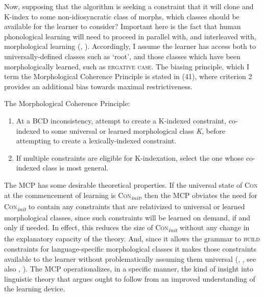 \documentclass[output=paper,
modfonts
]{LSP/langsci}
\begin{document}
Now, supposing that the algorithm is seeking a constraint that it will clone and K-index to some non-idiosyncratic class of morphs, which classes should be available for the learner to consider? Important here is the fact that human phonological learning will need to proceed in parallel with, and interleaved with, morphological learning (\citealt{tesar2007}, \citealt[6]{merchant2008}). Accordingly, I assume the learner has access both to universally-defined classes such as `root', and those classes which have been morphologically learned, such as \textsc{ergative case}. The biasing principle, which I term the Morphological Coherence Principle is stated in (41), where criterion 2 provides an additional bias towards maximal restrictiveness.

\ea The Morphological Coherence Principle:
\begin{enumerate}
\item At a BCD inconsistency, attempt to create a K-indexed constraint, co-indexed to some universal or learned morphological class \textit{K}, before attempting to create a lexically-indexed constraint.
\item If multiple constraints are eligible for K-indexation, select the one whose co-indexed class is most general.
\end{enumerate}
\z

The MCP has some desirable theoretical properties. If the universal state of \textsc{Con} at the commencement of learning is \textsc{Con}\textit{\textsubscript{init}}, then the MCP obviates the need for \textsc{Con}\textit{\textsubscript{init}} to contain any constraints that are relativized to universal or learned morphological classes, since such constraints will be learned on demand, if and only if needed. In effect, this reduces the size of \textsc{Con}\textit{\textsubscript{init}} without any change in the explanatory capacity of the theory. And, since it allows the grammar to \textsc{build} constraints for language-specific morphological classes it makes those constraints available to the learner without problematically assuming them universal (\citealt{russell1995}, \citealt{hammond2000}, see also \citealt{smith2004}, \citealt{flack2007r}). The MCP operationalizes, in a specific manner, the kind of insight into linguistic theory that \citet{anderson2008} argues ought to follow from an improved understanding of the learning device. 
\end{document}
